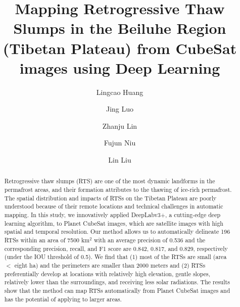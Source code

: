 \documentclass[preprint,12pt,authoryear]{elsarticle}
\begin{document}
\begin{frontmatter}




\title{Mapping Retrogressive Thaw Slumps in the Beiluhe Region (Tibetan Plateau) from CubeSat images using Deep Learning}


\author[a]{Lingcao Huang}
\author[b]{Jing Luo}
\author[b]{Zhanju Lin}
\author[b]{Fujun Niu}
\author[a]{Lin Liu}


\address[a]{Earth System Science Programme, Faculty of Science, The Chinese University of Hong Kong, Hong Kong SAR, China.}
\address[b]{Northwest Institute of Eco-Environment and Resources, Chinese Academy of Sciences, LanZhou, China.}

\begin{abstract}

Retrogressive thaw slumps (RTS) are one of the most dynamic landforms in the permafrost areas, and their formation attributes to the thawing of ice-rich permafrost. The spatial distribution and impacts of RTSs on the Tibetan Plateau are poorly understood because of their remote locations and technical challenges in automatic mapping. In this study, we innovatively applied DeepLabv3+, a cutting-edge deep learning algorithm, to Planet CubeSat images, which are satellite images with high spatial and temporal resolution.  Our method allows us to automatically delineate 196 RTSs within an area of 7500 km$^2$ with an average precision of 0.536 and the corresponding precision, recall, and F1 score are 0.842, 0.817, and 0.829, respectively (under the IOU threshold of 0.5). We find that (1) most of the RTSs are small (area $<$ eight ha) and the perimeters are smaller than 2000 meters and (2) RTSs preferentially develop at locations with relatively high elevation, gentle slopes, relatively lower than the surroundings, and receiving less solar radiations. The results show that the method can map RTSs automatically from Planet CubeSat images and has the potential of applying to larger areas.



\end{abstract}
\end{frontmatter}
\end{document}
